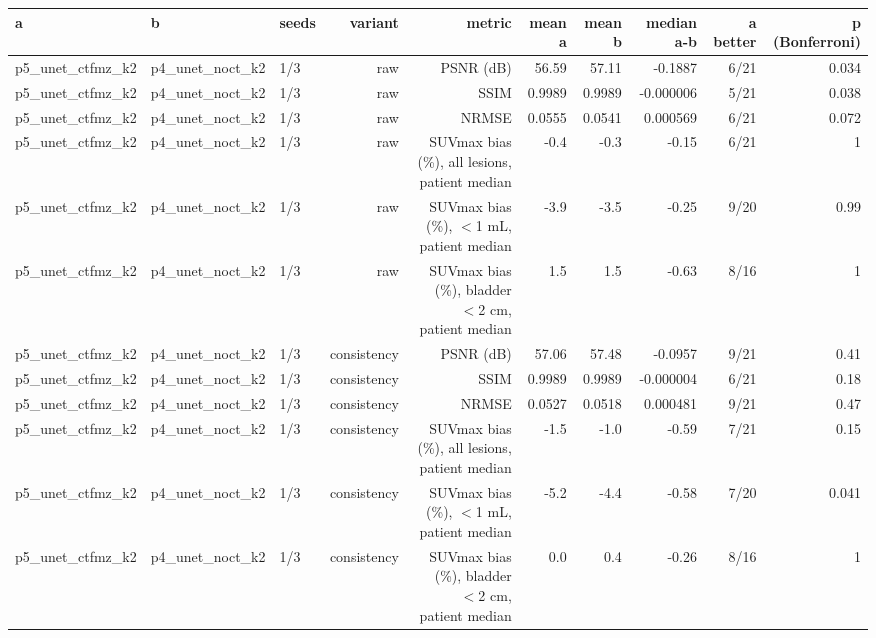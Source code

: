 \begin{tabular}{lllrrrrrrr}
\toprule
a & b & seeds & variant & metric & mean a & mean b & median a-b & a better & p (Bonferroni) \\
\midrule
p5\_unet\_ctfmz\_k2 & p4\_unet\_noct\_k2 & 1/3 & raw & PSNR (dB) & 56.59 & 57.11 & -0.1887 & 6/21 & 0.034 \\
p5\_unet\_ctfmz\_k2 & p4\_unet\_noct\_k2 & 1/3 & raw & SSIM & 0.9989 & 0.9989 & -0.000006 & 5/21 & 0.038 \\
p5\_unet\_ctfmz\_k2 & p4\_unet\_noct\_k2 & 1/3 & raw & NRMSE & 0.0555 & 0.0541 & 0.000569 & 6/21 & 0.072 \\
p5\_unet\_ctfmz\_k2 & p4\_unet\_noct\_k2 & 1/3 & raw & SUVmax bias (\%), all lesions, patient median & -0.4 & -0.3 & -0.15 & 6/21 & 1 \\
p5\_unet\_ctfmz\_k2 & p4\_unet\_noct\_k2 & 1/3 & raw & SUVmax bias (\%), $<$1 mL, patient median & -3.9 & -3.5 & -0.25 & 9/20 & 0.99 \\
p5\_unet\_ctfmz\_k2 & p4\_unet\_noct\_k2 & 1/3 & raw & SUVmax bias (\%), bladder $<$2 cm, patient median & 1.5 & 1.5 & -0.63 & 8/16 & 1 \\
p5\_unet\_ctfmz\_k2 & p4\_unet\_noct\_k2 & 1/3 & consistency & PSNR (dB) & 57.06 & 57.48 & -0.0957 & 9/21 & 0.41 \\
p5\_unet\_ctfmz\_k2 & p4\_unet\_noct\_k2 & 1/3 & consistency & SSIM & 0.9989 & 0.9989 & -0.000004 & 6/21 & 0.18 \\
p5\_unet\_ctfmz\_k2 & p4\_unet\_noct\_k2 & 1/3 & consistency & NRMSE & 0.0527 & 0.0518 & 0.000481 & 9/21 & 0.47 \\
p5\_unet\_ctfmz\_k2 & p4\_unet\_noct\_k2 & 1/3 & consistency & SUVmax bias (\%), all lesions, patient median & -1.5 & -1.0 & -0.59 & 7/21 & 0.15 \\
p5\_unet\_ctfmz\_k2 & p4\_unet\_noct\_k2 & 1/3 & consistency & SUVmax bias (\%), $<$1 mL, patient median & -5.2 & -4.4 & -0.58 & 7/20 & 0.041 \\
p5\_unet\_ctfmz\_k2 & p4\_unet\_noct\_k2 & 1/3 & consistency & SUVmax bias (\%), bladder $<$2 cm, patient median & 0.0 & 0.4 & -0.26 & 8/16 & 1 \\
\bottomrule
\end{tabular}

